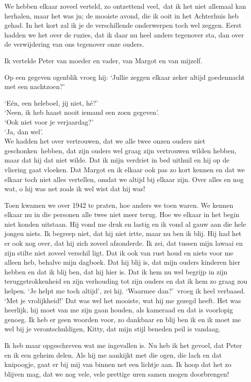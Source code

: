 \documentclass{book}
\begin{document}
We hebben elkaar zoveel verteld, zo ontzettend veel,~dat ik het niet
allemaal kan herhalen, maar het was jn; de mooiste avond, die ik ooit in
het Achterhuis heb gehad. In het kort zal ik je de verschillende
onderwerpen toch wel zeggen. Eerst hadden we het over de ruzies, dat ik
daar nu heel anders tegenover sta, dan over de verwijdering van ons
tegenover onze ouders.

Ik vertelde Peter van moeder en vader, van Margot en van mijzelf.

Op een gegeven ogenblik vroeg hij: `Jullie zeggen elkaar zeker altijd
goedennacht met een nachtzoen?'

`Eén, een heleboel, jij niet, hé?'\\`Neen, ik heb haast nooit iemand een
zoen gegeven'.\\`Ook niet voor je verjaardag?'\\`Ja, dan wel'.\\We
hadden het over vertrouwen, dat we alle twee onzen ouders niet
geschonken~hebben, dat zijn ouders wel graag zijn vertrouwen wilden
hebben, maar dat hij dat niet wilde. Dat ik mijn verdriet in bed uithuil
en hij op de vliering gaat vloeken. Dat Margot en ik elkaar ook pas zo
kort kennen en dat we elkaar toch niet alles vertellen, omdat we altijd
bij elkaar zijn. Over alles en nog wat, o hij was net zoals ik wel wist
dat hij was!

Toen kwamen we over 1942 te praten, hoe anders we toen waren. We kennen
elkaar nu in die personen alle twee niet meer terug. Hoe we elkaar in
het begin niet konden uitstaan. Hij vond me druk en lastig en ik vond al
gauw aan die hele jongen niets. Ik begreep niet, dat hij niet irtte,
maar nu ben ik blij. Hij had het er ook nog over, dat hij zich zoveel
afzonderde. Ik zei, dat tussen mijn lawaai en zijn stilte niet zoveel
verschil ligt. Dat ik ook van rust houd en niets voor me alleen heb,
behalve mijn dagboek. Dat hij blij is, dat mijn ouders kinderen hier
hebben en dat ik blij ben, dat hij hier is. Dat ik hem nu wel begrijp in
zijn teruggetrokkenheid en zijn verhouding tot zijn ouders en dat ik hem
zo graag zou helpen. `Je helpt me toch altijd', zei hij. `Waarmee
dan?'~vroeg ik heel verbaasd. `Met je vrolijkheid!' Dat was wel het
mooiste, wat hij me gezegd heeft. Het was heerlijk, hij moet van me zijn
gaan houden, als kameraad en dat is voorlopig genoeg. Ik heb er geen
woorden voor, zo dankbaar en blij ben ik en ik moet me wel bij je
verontschuldigen, Kitty, dat mijn stijl beneden peil is vandaag.

Ik heb maar opgeschreven wat me ingevallen is. Nu heb ik het gevoel, dat
Peter en ik een geheim delen. Als hij me aankijkt met die ogen, die lach
en dat knipoogje, gaat er bij mij van binnen net een lichtje aan. Ik
hoop dat het zo blijven mag, dat we nog vele, vele prettige uren samen
mogen doorbrengen!
\end{document}

